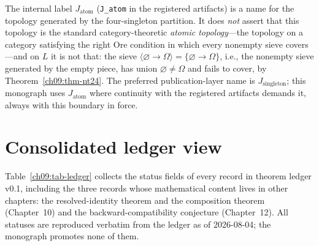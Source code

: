 \begin{boundary}\label{ch09:boundary-atom}
The internal label $J_{\mathrm{atom}}$ (\texttt{J\_atom} in the registered artifacts) is a name for the topology generated by the four-singleton partition. It does \emph{not} assert that this topology is the standard category-theoretic \emph{atomic topology}---the topology on a category satisfying the right Ore condition in which every nonempty sieve covers \cite{maclane, johnstone}---and on $L$ it is not that: the sieve $\langle\varnothing\to\Omega\rangle=\{\varnothing\to\Omega\}$, i.e., the nonempty sieve generated by the empty piece, has union $\varnothing\neq\Omega$ and fails to cover, by Theorem~\ref{ch09:thm-nt24}. The preferred publication-layer name is $J_{\mathrm{singleton}}$; this monograph uses $J_{\mathrm{atom}}$ where continuity with the registered artifacts demands it, always with this boundary in force.
\end{boundary}

\section{Consolidated ledger view}\label{ch09:sec-ledger}

Table~\ref{ch09:tab-ledger} collects the status fields of every record in theorem ledger v0.1, including the three records whose mathematical content lives in other chapters: the resolved-identity theorem and the composition theorem (Chapter~10) and the backward-compatibility conjecture (Chapter~12). All statuses are reproduced verbatim from the ledger as of 2026-08-04; the monograph promotes none of them.

